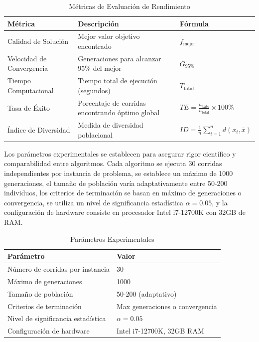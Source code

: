 \documentclass[10pt,a4paper]{article}
\begin{document}
\begin{table}[H]
\centering
\caption{Métricas de Evaluación de Rendimiento}
\begin{tabular}{@{}lll@{}}
\toprule
\textbf{Métrica} & \textbf{Descripción} & \textbf{Fórmula} \\
\midrule
Calidad de Solución & Mejor valor objetivo encontrado & $f_{\text{mejor}}$ \\
Velocidad de Convergencia & Generaciones para alcanzar 95\% del mejor & $G_{95\%}$ \\
Tiempo Computacional & Tiempo total de ejecución (segundos) & $T_{\text{total}}$ \\
Tasa de Éxito & Porcentaje de corridas encontrando óptimo global & $TE = \frac{n_{\text{éxito}}}{n_{\text{total}}} \times 100\%$ \\
Índice de Diversidad & Medida de diversidad poblacional & $ID = \frac{1}{n}\sum_{i=1}^{n}d(x_i, \bar{x})$ \\
\bottomrule
\end{tabular}
\label{tab:metrics}
\end{table}

Los parámetros experimentales se establecen para asegurar rigor científico y comparabilidad entre algoritmos. Cada algoritmo se ejecuta 30 corridas independientes por instancia de problema, se establece un máximo de 1000 generaciones, el tamaño de población varía adaptativamente entre 50-200 individuos, los criterios de terminación se basan en máximo de generaciones o convergencia, se utiliza un nivel de significancia estadística $\alpha = 0.05$, y la configuración de hardware consiste en procesador Intel i7-12700K con 32GB de RAM.

\begin{table}[H]
\centering
\caption{Parámetros Experimentales}
\begin{tabular}{@{}ll@{}}
\toprule
\textbf{Parámetro} & \textbf{Valor} \\
\midrule
Número de corridas por instancia & 30 \\
Máximo de generaciones & 1000 \\
Tamaño de población & 50-200 (adaptativo) \\
Criterios de terminación & Max generaciones o convergencia \\
Nivel de significancia estadística & $\alpha = 0.05$ \\
Configuración de hardware & Intel i7-12700K, 32GB RAM \\
\bottomrule
\end{tabular}
\label{tab:parameters}
\end{table}
\end{document}
